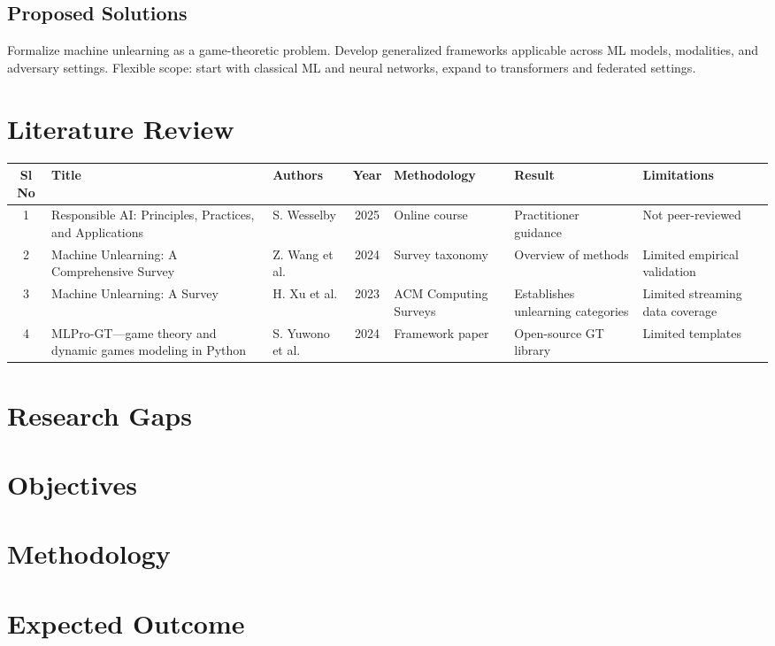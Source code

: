 \documentclass[12pt,a4paper]{report}
\begin{document}
\section{Proposed Solutions}
Formalize machine unlearning as a game-theoretic problem.  
Develop generalized frameworks applicable across ML models, modalities, and adversary settings.  
Flexible scope: start with classical ML and neural networks, expand to transformers and federated settings.

\chapter{Literature Review}
\begin{longtable}{|c|p{4cm}|p{3cm}|c|p{3cm}|p{3cm}|p{3cm}|}
\hline
Sl No & Title & Authors & Year & Methodology & Result & Limitations \\
\hline
1 & Responsible AI: Principles, Practices, and Applications & S. Wesselby & 2025 & Online course & Practitioner guidance & Not peer-reviewed \\
\hline
2 & Machine Unlearning: A Comprehensive Survey & Z. Wang et al. & 2024 & Survey taxonomy & Overview of methods & Limited empirical validation \\
\hline
3 & Machine Unlearning: A Survey & H. Xu et al. & 2023 & ACM Computing Surveys & Establishes unlearning categories & Limited streaming data coverage \\
\hline
4 & MLPro-GT—game theory and dynamic games modeling in Python & S. Yuwono et al. & 2024 & Framework paper & Open-source GT library & Limited templates \\
\hline
\end{longtable}

\chapter{Research Gaps}

\chapter{Objectives}

\chapter{Methodology}

\chapter{Expected Outcome}
\end{document}
